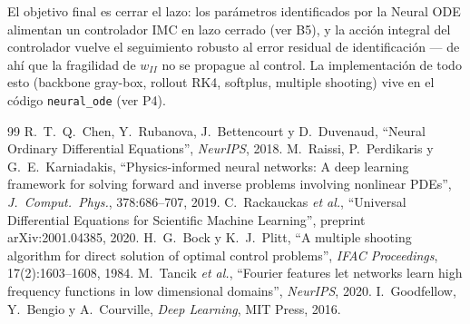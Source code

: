 \documentclass[11pt,a4paper]{article}
\begin{document}
El objetivo final es cerrar el lazo: los parámetros identificados por la Neural ODE alimentan un controlador IMC en lazo cerrado (ver B5), y la acción integral del controlador vuelve el seguimiento robusto al error residual de identificación --- de ahí que la fragilidad de $w_{II}$ no se propague al control. La implementación de todo esto (backbone gray-box, rollout RK4, softplus, multiple shooting) vive en el código \texttt{neural\_ode} (ver P4).

\begin{thebibliography}{99}
 R.~T.~Q.~Chen, Y.~Rubanova, J.~Bettencourt y D.~Duvenaud, ``Neural Ordinary Differential Equations'', \emph{NeurIPS}, 2018.
 M.~Raissi, P.~Perdikaris y G.~E.~Karniadakis, ``Physics-informed neural networks: A deep learning framework for solving forward and inverse problems involving nonlinear PDEs'', \emph{J.\ Comput.\ Phys.}, 378:686--707, 2019.
 C.~Rackauckas \emph{et al.}, ``Universal Differential Equations for Scientific Machine Learning'', preprint arXiv:2001.04385, 2020.
 H.~G.~Bock y K.~J.~Plitt, ``A multiple shooting algorithm for direct solution of optimal control problems'', \emph{IFAC Proceedings}, 17(2):1603--1608, 1984.
 M.~Tancik \emph{et al.}, ``Fourier features let networks learn high frequency functions in low dimensional domains'', \emph{NeurIPS}, 2020.
 I.~Goodfellow, Y.~Bengio y A.~Courville, \emph{Deep Learning}, MIT Press, 2016.
\end{thebibliography}
\end{document}
